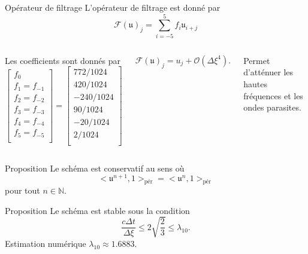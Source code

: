 \documentclass[11pt]{beamer}
\def\gsum{\displaystyle\sum\limits}
\begin{document}
\begin{frame}{Opérateur de filtrage}
L'opérateur de filtrage est donné par
$$
\mathcal{F} (\mathfrak{u})_j = \gsum_{i=-5}^5 f_i \mathfrak{u}_{i+j} 
$$
\begin{columns}
Les coefficients sont donnés par
$$
\begin{bmatrix}
f_0\\
f_1 = f_{-1}\\
f_2 = f_{-2}\\
f_3 = f_{-3}\\
f_4 = f_{-4}\\
f_5 = f_{-5}\\
\end{bmatrix} =
\begin{bmatrix}
772/1024\\
420/1024\\
-240/1024\\
90/1024\\
-20/1024\\
2/1024\\
\end{bmatrix}
$$


\begin{block}{}
$$
\mathcal{F}(\mathfrak{u})_j = u_j + \mathcal{O} \left( \Delta \xi^4 \right).
$$
\end{block}

\begin{block}{}
Permet d'atténuer les hautes fréquences et les ondes parasites.
\end{block}
\end{columns}

\end{frame}





\begin{frame}{}
\begin{block}{Proposition}
Le schéma est conservatif au sens où
$$
<\mathfrak{u}^{n+1},\mathfrak{1}>_{\text{pér}} = <\mathfrak{u}^{n},\mathfrak{1}>_{\text{pér}}
$$
pour tout $n \in \mathbb{N}$.
\end{block}


\begin{block}{Proposition}
Le schéma est stable sous la condition
$$
\dfrac{c \Delta t}{\Delta \xi} \leq 2 \sqrt{\dfrac{2}{3}} \leq \lambda_{10}.
$$
Estimation numérique $\lambda_{10} \approx 1.6883$. 
\end{block}
\end{frame}
\end{document}
